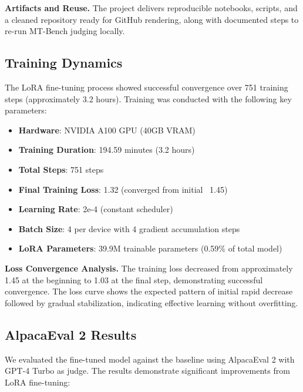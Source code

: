\documentclass{assignment7_report}
\begin{document}
\textbf{Artifacts and Reuse.} The project delivers reproducible notebooks, scripts, and a cleaned repository ready for GitHub rendering, along with documented steps to re-run MT-Bench judging locally.

\subsection{Training Dynamics}

The LoRA fine-tuning process showed successful convergence over 751 training steps (approximately 3.2 hours). Training was conducted with the following key parameters:

\begin{itemize}
\item \textbf{Hardware}: NVIDIA A100 GPU (40GB VRAM)
\item \textbf{Training Duration}: 194.59 minutes (3.2 hours)
\item \textbf{Total Steps}: 751 steps
\item \textbf{Final Training Loss}: 1.32 (converged from initial ~1.45)
\item \textbf{Learning Rate}: 2e-4 (constant scheduler)
\item \textbf{Batch Size}: 4 per device with 4 gradient accumulation steps
\item \textbf{LoRA Parameters}: 39.9M trainable parameters (0.59\% of total model)
\end{itemize}

\textbf{Loss Convergence Analysis.} The training loss decreased from approximately 1.45 at the beginning to 1.03 at the final step, demonstrating successful convergence. The loss curve shows the expected pattern of initial rapid decrease followed by gradual stabilization, indicating effective learning without overfitting.


\subsection{AlpacaEval 2 Results}

We evaluated the fine-tuned model against the baseline using AlpacaEval 2 with GPT-4 Turbo as judge. The results demonstrate significant improvements from LoRA fine-tuning:
\end{document}
